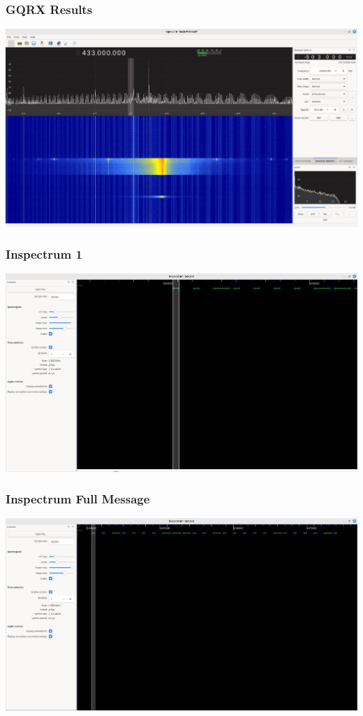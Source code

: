 \documentclass{beamer}
\begin{document}
\begin{frame}
\frametitle{GQRX Results}
\includegraphics[width=\textwidth]{../Pics/screenshots/gqrx-results.png}
\end{frame}

\begin{frame}
\frametitle{Inspectrum 1}
\includegraphics[width=\textwidth]{../Pics/screenshots/inspectrum-1.png}
\end{frame}

\begin{frame}
\frametitle{Inspectrum Full Message}
\includegraphics[width=\textwidth]{../Pics/screenshots/inspectrum_full_message.png}
\end{frame}
\end{document}
